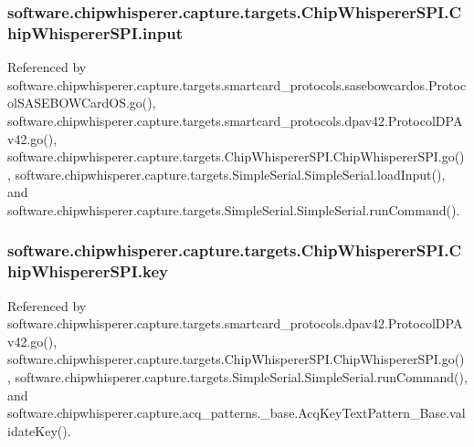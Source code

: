 \subsubsection[{input}]{\setlength{\rightskip}{0pt plus 5cm}software.\+chipwhisperer.\+capture.\+targets.\+Chip\+Whisperer\+S\+P\+I.\+Chip\+Whisperer\+S\+P\+I.\+input}\label{classsoftware_1_1chipwhisperer_1_1capture_1_1targets_1_1ChipWhispererSPI_1_1ChipWhispererSPI_a2e87e31439adf64e099abfddf7081c87}


Referenced by software.\+chipwhisperer.\+capture.\+targets.\+smartcard\+\_\+protocols.\+sasebowcardos.\+Protocol\+S\+A\+S\+E\+B\+O\+W\+Card\+O\+S.\+go(), software.\+chipwhisperer.\+capture.\+targets.\+smartcard\+\_\+protocols.\+dpav42.\+Protocol\+D\+P\+Av42.\+go(), software.\+chipwhisperer.\+capture.\+targets.\+Chip\+Whisperer\+S\+P\+I.\+Chip\+Whisperer\+S\+P\+I.\+go(), software.\+chipwhisperer.\+capture.\+targets.\+Simple\+Serial.\+Simple\+Serial.\+load\+Input(), and software.\+chipwhisperer.\+capture.\+targets.\+Simple\+Serial.\+Simple\+Serial.\+run\+Command().

\hypertarget{classsoftware_1_1chipwhisperer_1_1capture_1_1targets_1_1ChipWhispererSPI_1_1ChipWhispererSPI_a61940f5cc3ccf0efa45d7ce0c3622433}{}
\subsubsection[{key}]{\setlength{\rightskip}{0pt plus 5cm}software.\+chipwhisperer.\+capture.\+targets.\+Chip\+Whisperer\+S\+P\+I.\+Chip\+Whisperer\+S\+P\+I.\+key}\label{classsoftware_1_1chipwhisperer_1_1capture_1_1targets_1_1ChipWhispererSPI_1_1ChipWhispererSPI_a61940f5cc3ccf0efa45d7ce0c3622433}


Referenced by software.\+chipwhisperer.\+capture.\+targets.\+smartcard\+\_\+protocols.\+dpav42.\+Protocol\+D\+P\+Av42.\+go(), software.\+chipwhisperer.\+capture.\+targets.\+Chip\+Whisperer\+S\+P\+I.\+Chip\+Whisperer\+S\+P\+I.\+go(), software.\+chipwhisperer.\+capture.\+targets.\+Simple\+Serial.\+Simple\+Serial.\+run\+Command(), and software.\+chipwhisperer.\+capture.\+acq\+\_\+patterns.\+\_\+base.\+Acq\+Key\+Text\+Pattern\+\_\+\+Base.\+validate\+Key().

